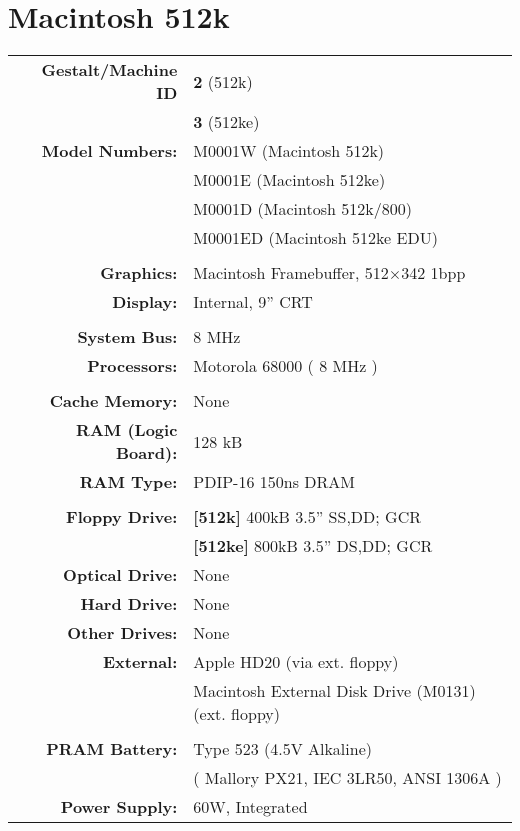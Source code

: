 
\section{Macintosh 512k}
\sectionrule

\begin{tabular}{ r p{6in} }
\textbf{Gestalt/Machine ID} & \textbf{2} (512k) \\
~ & \textbf{3} (512ke) \\
\textbf{Model Numbers:} & M0001W (Macintosh 512k) \\
~ & M0001E (Macintosh 512ke) \\
~ & M0001D (Macintosh 512k/800) \\
~ & M0001ED (Macintosh 512ke EDU) \\
\\
\textbf{Graphics:} & Macintosh Framebuffer, 512\(\times\)342 1bpp \\
\textbf{Display:} & Internal, 9'' CRT \\
\\
\textbf{System Bus:} & 8 MHz \\
\textbf{Processors:} & Motorola 68000 ( 8 MHz ) \\
\\
\textbf{Cache Memory:} & None \\
\textbf{RAM (Logic Board):} & 128 kB \\
\textbf{RAM Type:} & PDIP-16 150ns DRAM \\
\\
\textbf{Floppy Drive:} & \textbf{[512k]} 400kB 3.5'' SS,DD; GCR \\
~ & \textbf{[512ke]} 800kB 3.5'' DS,DD; GCR \\
\textbf{Optical Drive:} & None \\
\textbf{Hard Drive:} & None \\
\textbf{Other Drives:} & None \\
\textbf{External:} & Apple HD20 (via ext. floppy) \\
~ & Macintosh External Disk Drive (M0131) (ext. floppy) \\
\\
\textbf{PRAM Battery:} & Type 523 (4.5V Alkaline) \\
~ & ( Mallory PX21, IEC 3LR50, ANSI 1306A )\\
\textbf{Power Supply:} & 60W, Integrated \\

\end{tabular}
